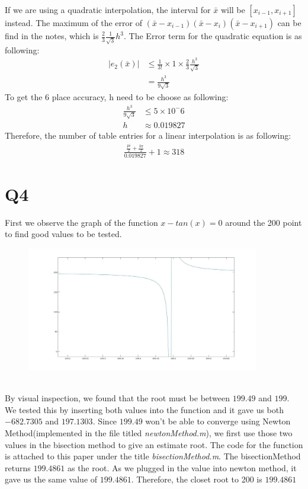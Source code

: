 \documentclass{article}
\begin{document}
If we are using a quadratic interpolation, the interval for $\bar{x}$ will be $[x_{i-1}, x_{i+1}]$ instead. The maximum of the error of $(\bar{x} - x_{i-1})(\bar{x} - x_i)(\bar{x} - x_{i+1})$ can be find in the notes, which is $\frac{2}{3}\frac{1}{\sqrt{3}}h^3$. The Error term for the quadratic equation is as following:
\begin{equation*}
\begin{aligned}
|e_2(\bar{x})| &\leq \frac{1}{3!} \times 1 \times \frac{2}{3}\frac{h^3}{\sqrt{3}} \\
&= \frac{h^3}{9\sqrt{3}}
\end{aligned}
\end{equation*}
To get the 6 place accuracy, h need to be choose as following:
\begin{equation*}
\begin{aligned}
\frac{h^3}{9\sqrt{3}} &\leq 5 \times 10^-6\\
	h &\approx 0.019827	
\end{aligned}
\end{equation*}
Therefore, the number of table entries for a linear interpolation is as following:
\begin{equation*}
\begin{aligned}
\frac{\frac{pi}{2} + \frac{3\pi}{2}}{0.019827} + 1 \approx 318
\end{aligned}
\end{equation*}
\section{Q4}
First we observe the graph of the function $x - tan(x) = 0$ around the 200 point to find good values to be tested. 
\begin{figure}[h]
\includegraphics[width=4in]{p4.jpg}
\end{figure}\\
By visual inspection, we found that the root must be between $199.49$ and $199$. We tested this by inserting both values into the function and it gave us both $-682.7305$ and $197.1303$. Since $199.49$ won't be able to converge using Newton Method(implemented in the file titled \textit{newtonMethod.m}), we first use those two values in the bisection method to give an estimate root. The code for the function is attached to this paper under the title \textit{bisectionMethod.m}. The bisectionMethod returns $199.4861$ as the root. As we plugged in the value into newton method, it gave us the same value of $199.4861$. Therefore, the closet root to 200 is $199.4861$
\end{document}
